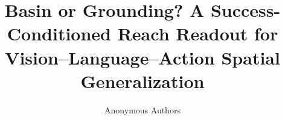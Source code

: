 \documentclass[10pt]{article}
\title{\bf Basin or Grounding? A Success-Conditioned Reach Readout for\\
Vision--Language--Action Spatial Generalization}
\author{Anonymous Authors}
\affil{}
\date{}
\begin{document}
\maketitle

\begin{abstract}

\end{abstract}











\appendix

\end{document}
